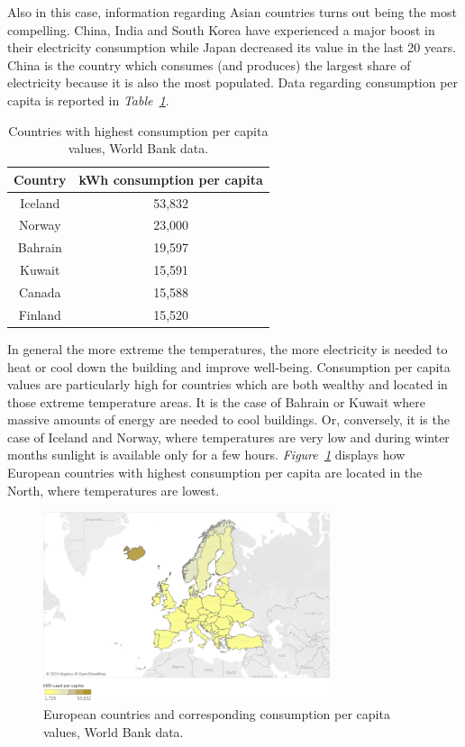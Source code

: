 \documentclass[a4paper,12pt]{book}
\begin{document}
Also in this case, information regarding Asian countries turns out being the most compelling. China, India and South Korea have experienced a major boost in their electricity consumption while Japan decreased its value in the last 20 years. China is the country which consumes (and produces) the largest share of electricity because it is also the most populated. Data regarding consumption per capita is reported in \textit{Table~\ref{Tab:cons}}.

\begin{table}[tb]
\begin{center}
\begin{tabular}{|c|c|}
\hline
Country & kWh consumption per capita\\
\hline
Iceland & 53,832\\
Norway & 23,000\\
Bahrain & 19,597\\
Kuwait & 15,591\\
Canada & 15,588\\
Finland & 15,520\\
\hline
\end{tabular}
\caption{Countries with highest consumption per capita values, World Bank data.}
\label{Tab:cons}
\end{center}
\end{table}

In general the more extreme the temperatures, the more electricity is needed to heat or cool down the building and improve well-being. Consumption per capita values are particularly high for countries which are both wealthy and located in those extreme temperature areas. It is the case of Bahrain or Kuwait where massive amounts of energy are needed to cool buildings. Or, conversely, it is the case of Iceland and Norway, where temperatures are very low and during winter months sunlight is available only for a few hours. \textit{Figure~\ref{fig:conspc}} displays how European countries with highest consumption per capita are located in the North, where temperatures are lowest.

\begin{figure}[tb]
\begin{center}
\captionsetup{justification=centering}
\includegraphics[width=0.75\textwidth]{Images/cons.png}
\caption{European countries and corresponding consumption per capita values, World Bank data. }
\label{fig:conspc}
\end{center}
\end{figure}
\end{document}

